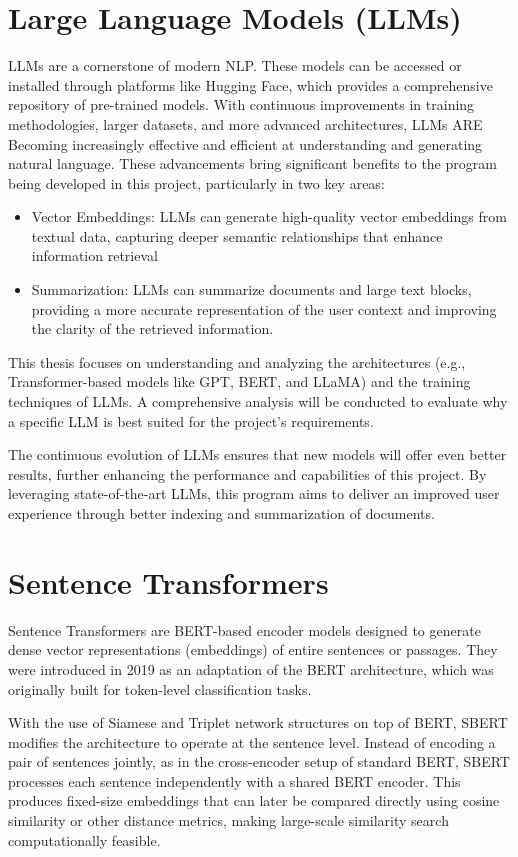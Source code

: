 \section{Large Language Models (LLMs)}
\ac{LLM}s are a cornerstone of modern \ac{NLP}. These models can be accessed or installed through platforms like Hugging Face, which provides a comprehensive repository of pre-trained models. With continuous improvements in training methodologies, larger datasets, and more advanced architectures, \ac{LLM}s ARE Becoming increasingly effective and efficient at understanding and generating natural language.
These advancements bring significant benefits to the program being developed in this project, particularly in two key areas:
\begin{itemize}
    \item Vector Embeddings: \ac{LLM}s can generate high-quality vector embeddings from textual data, capturing deeper semantic relationships that enhance information retrieval
    \item Summarization: \ac{LLM}s can summarize documents and large text blocks, providing a more accurate representation of the user context and improving the clarity of the retrieved information.
\end{itemize}
This thesis focuses on understanding and analyzing the architectures (e.g., Transformer-based models like GPT, BERT, and LLaMA) and the training techniques of \ac{LLM}s. A comprehensive analysis will be conducted to evaluate why a specific \ac{LLM} is best suited for the project's requirements.

The continuous evolution of \ac{LLM}s ensures that new models will offer even better results, further enhancing the performance and capabilities of this project. By leveraging state-of-the-art \ac{LLM}s, this program aims to deliver an improved user experience through better indexing and summarization of documents.

\section{Sentence Transformers}
Sentence Transformers are BERT-based encoder models designed to generate dense vector representations (embeddings) of entire sentences or passages. 
They were introduced in 2019 \cite{reimers2019sentencebertsentenceembeddingsusing} as an adaptation of the BERT architecture, which was originally built for token-level classification tasks.

With the use of Siamese and Triplet network structures on top of BERT, SBERT modifies the architecture to operate at the sentence level. Instead of encoding a pair of sentences jointly, as in the cross-encoder setup of standard BERT, SBERT processes each sentence independently with a shared BERT encoder. This produces fixed-size embeddings that can later be compared directly using cosine similarity or other distance metrics, making large-scale similarity search computationally feasible.

